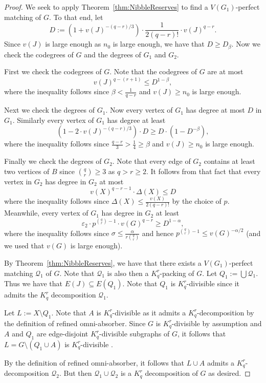 \documentclass[11pt]{article}
\newcounter{i}
\theoremstyle{plain}
\theoremstyle{plain} %
\theoremstyle{definition}
\begin{document}
\begin{proof}
We seek to apply Theorem~\ref{thm:NibbleReserves} to find a $V(G_1)$-perfect matching of $G$. To that end, let 
$$D:= (1 + v(J)^{-(q-r)/3}) \cdot \frac{1}{2(q-r)!} \cdot v(J)^{q-r}.$$  
Since $v(J)$ is large enough as $n_0$ is large enough, we have that $D\ge D_{\beta}$. Now we check the codegrees of $G$ and the degrees of $G_1$ and $G_2$.

First we check the codegrees of $G$. Note that the codegrees of $G$ are at most 
$$v(J)^{q-(r+1)} \le D^{1-\beta},$$
where the inequality follows since $\beta < \frac{1}{q-r}$ and $v(J)\ge n_0$ is large enough. 

Next we check the degrees of $G_1$. Now every vertex of $G_1$ has degree at most $D$ in $G_1$. Similarly every vertex of $G_1$ has degree at least 
$$(1 - 2\cdot v(J)^{-(q-r)/3})\cdot D \ge D\cdot (1-D^{-\beta}),$$ 
where the inequality follows since $\frac{q-r}{3} > \frac{1}{4} \ge \beta$ and $v(J)\ge n_0$ is large enough. 

Finally we check the degrees of $G_2$. Note that every edge of $G_2$ contains at least two vertices of $B$ since $\binom{q}{r}\ge 3$ as $q> r\ge 2$. It follows from that fact that every vertex in $G_2$ has degree in $G_2$ at most 
$$v(X)^{q-r-1}\cdot \Delta(X) \le D$$ 
where the inequality follows since $\Delta(X) \le \frac{v(X)}{2(q-r)!}$ by the choice of $p$. Meanwhile, every vertex of $G_1$ has degree in $G_2$ at least 
$$\varepsilon_2\cdot p^{\binom{q}{r}-1} \cdot v(G)^{q-r} \ge D^{1-\alpha},$$
where the inequality follows since $\sigma \le \frac{\alpha}{r\binom{q}{r}}$ and hence $p^{\binom{q}{r}-1} \le v(G)^{-\alpha/2}$ (and we used that $v(G)$ is large enough).

By Theorem~\ref{thm:NibbleReserves}, we have that there exists a $V(G_1)$-perfect matching $\mathcal{Q}_1$ of $G$. Note that $\mathcal{Q}_1$ is also then a $K_q^r$-packing of $G$. Let $Q_1 := \bigcup \mathcal{Q}_1$. Thus we have that $E(J)\subseteq E(Q_1)$. Note that $Q_1$ is $K_q^r$-divisible since it admits the $K_q^r$ decomposition $\mathcal{Q}_1$. 

Let $L := X\setminus Q_1$. Note that $A$ is $K_q^r$-divisible as it admits a $K_q^r$-decomposition by the definition of refined omni-absorber. Since $G$ is $K_q^r$-divisible by assumption and $A$ and $Q_1$ are edge-disjoint $K_q^r$-divisible subgraphs of $G$, it follows that $L = G\setminus (Q_1\cup A)$ is $K_q^r$-divisible . 

By the definition of refined omni-absorber, it follows that $L\cup A$ admits a $K_q^r$-decomposition $\mathcal{Q}_2$. But then $\mathcal{Q}_1\cup\mathcal{Q}_2$ is a $K_q^r$ decomposition of $G$ as desired.
\end{proof}
\end{document}
